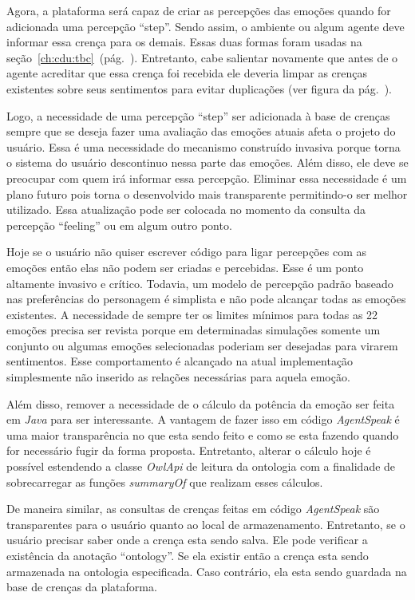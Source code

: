 Agora, a plataforma \jason será capaz de criar as percepções das emoções
quando for adicionada uma percepção ``step''. Sendo assim, o ambiente ou algum
agente deve informar essa crença para os demais.  Essas duas formas foram
usadas na seção~\ref{ch:cdu:tbc}~(pág.~\pageref{ch:cdu:tbc}). Entretanto, cabe
salientar novamente que antes de o agente acreditar que essa crença foi
recebida ele deveria limpar as crenças existentes sobre seus sentimentos para
evitar duplicações (ver figura da pág.~\pageref{fig:testeJasonIntBase}).

Logo, a necessidade de uma percepção ``step'' ser adicionada à base de crenças
sempre que se deseja fazer uma avaliação das emoções atuais afeta o projeto do
usuário. Essa é uma necessidade do mecanismo construído invasiva porque torna
o sistema do usuário descontinuo nessa parte das emoções. Além disso, ele deve
se preocupar com quem irá informar essa percepção. Eliminar essa necessidade é
um plano futuro pois torna o desenvolvido mais transparente permitindo-o ser
melhor utilizado. Essa atualização pode ser colocada no momento da consulta da
percepção ``feeling'' ou em algum outro ponto.

Hoje se o usuário não quiser escrever código para ligar percepções com as
emoções então elas não podem ser criadas e percebidas. Esse é um ponto
altamente invasivo e crítico. %
Todavia, um modelo de percepção padrão baseado nas preferências do personagem
é simplista e não pode alcançar todas as emoções existentes. A necessidade de
sempre ter os limites mínimos para todas as 22 emoções precisa ser revista
porque em determinadas simulações somente um conjunto ou algumas emoções
selecionadas poderiam ser desejadas para virarem sentimentos. Esse
comportamento é alcançado na atual implementação simplesmente não inserido as
relações necessárias para aquela emoção.

Além disso, remover a necessidade de o cálculo da potência da emoção ser feita
em \emph{Java} para ser interessante. A vantagem de fazer isso em código
\emph{AgentSpeak} é uma maior transparência no que esta sendo feito e como se
esta fazendo quando for necessário fugir da forma proposta. Entretanto,
alterar o cálculo hoje é possível estendendo a classe \emph{OwlApi} de leitura
da ontologia com a finalidade de sobrecarregar as funções \emph{summaryOf} que
realizam esses cálculos.

De maneira similar, as consultas de crenças feitas em código \emph{AgentSpeak}
são transparentes para o usuário quanto ao local de armazenamento. Entretanto,
se o usuário precisar saber onde a crença esta sendo salva. Ele pode verificar
a existência da anotação ``ontology''. Se ela existir então a crença esta
sendo armazenada na ontologia especificada. Caso contrário, ela esta sendo
guardada na base de crenças da plataforma.

